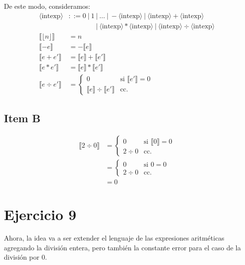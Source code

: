 \documentclass{article}
\newcommand{\aexp}[1]{\langle\text{#1}\rangle}
\newcommand{\intexp}{\aexp{intexp}}
\newcommand{\sem}[1]{\llbracket #1\rrbracket}
\begin{document}
De este modo, consideramos:
\begin{equation*}
	\begin{aligned}
		\intexp                & ::= 0\ |\ 1\ |\ \dots\ |\ -\intexp\ |\ \intexp + \intexp\  \\
		                       & \qquad\qquad |\ \intexp * \intexp\ |\ \intexp \div \intexp \\
		\sem{\lfloor n\rfloor} & = n                                                        \\
		\sem{-e}               & = -\sem{e}                                                 \\
		\sem{e + e'}           & = \sem{e} + \sem{e'}                                       \\
		\sem{e * e'}           & = \sem{e} * \sem{e'}                                       \\
		\sem{e \div e'}        & = \begin{cases}
			                           0                     & \text{si }\sem{e'}=0 \\
			                           \sem{e} \div \sem{e'} & \text{cc.}
		                           \end{cases}
	\end{aligned}
\end{equation*}

\subsection*{Item B}
\begin{equation*}
	\begin{aligned}
		\sem{2 \div 0} & = \begin{cases}
			                   0        & \text{si }\sem{0}=0 \\
			                   2 \div 0 & \text{cc.}
		                   \end{cases} \\
		               & = \begin{cases}
			                   0        & \text{si }0=0 \\
			                   2 \div 0 & \text{cc.}
		                   \end{cases}       \\
		               & = 0
	\end{aligned}
\end{equation*}

\section*{Ejercicio 9}
Ahora, la idea va a ser extender el lenguaje de las expresiones aritméticas agregando la división entera, pero también la constante $\text{error}$ para el caso de la división por $0$.
\end{document}
